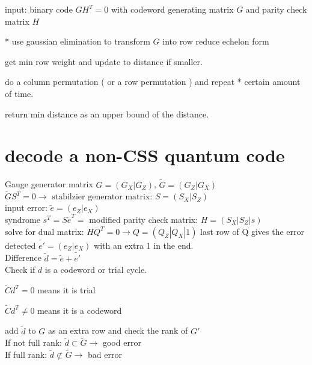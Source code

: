 \documentclass[aps,%
pra, twocolumn,%
notitlepage,longbibliography]{revtex4-2}
\begin{document}
input: binary code $GH^T=0$ with codeword generating matrix $G$ and
parity check matrix $H$

* use gaussian elimination to transform $G$ into row reduce echelon form

get min row weight and update to distance if smaller.

do a column permutation ( or a row permutation ) and repeat * certain
amount of time.

return min distance as an upper bound of the distance.




\section{decode a non-CSS quantum code}


Gauge generator matrix $G=(G_X|G_Z)$, $\tilde{G}=(G_Z|G_X)$\\
$\tilde{G}S^T=0 \longrightarrow \text{ stabilzier generator matrix: }  S=(S_X|S_Z)$\\
input error: $\tilde{e}=(e_Z|e_X)$\\
syndrome $ s^T=S\tilde{e}^T=$
modified parity check matrix: $H=(S_X|S_Z|s)$\\
solve for dual matrix: $HQ^T=0 \longrightarrow  Q=(Q_Z|Q_X|1)$
last row of Q gives the error detected $\tilde{e'}=(e_Z|e_X)$ with an extra 1 in the end.\\
Difference $\tilde{d}=\tilde{e}+\tilde{e'}$\\

Check if $d$ is a codeword or trial cycle.

$\tilde C  d^T = 0$ means it is trial

$\tilde C  d^T \neq 0$ means it is a codeword

add $\tilde{d}$ to $G$ as an extra row and check the rank of $G'$\\
If not full rank: $\tilde{d} \subset \tilde{G} \longrightarrow $ good error\\ 
If full rank:     $\tilde{d} \not\subset \tilde{G} \longrightarrow $ bad error\\ 






%
\end{document}
